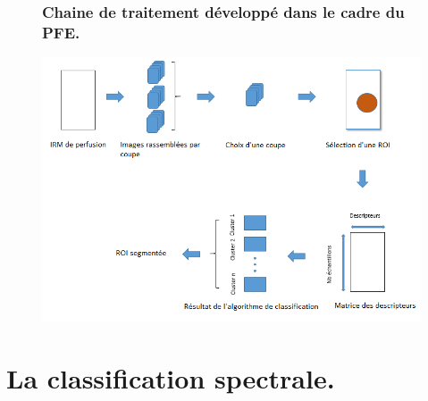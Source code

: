\documentclass{beamer}
\begin{document}
\begin{frame}

\begin{figure}

\frametitle{Chaine de traitement développé dans le cadre du PFE.}
\centering
    \includegraphics[scale=0.5,angle=0]{Processing_toolchain.png}
    \label{fig:Chaine} 
    
\end{figure}

\end{frame}


\section{La classification spectrale.}
\end{document}
